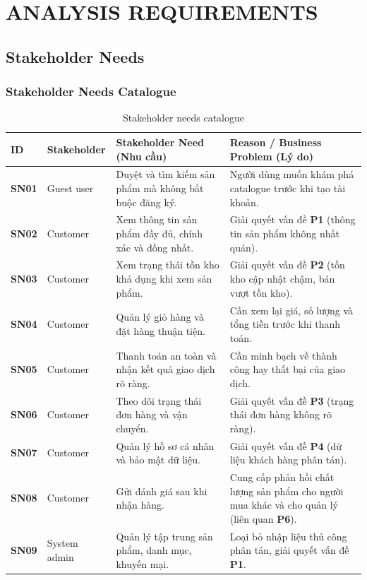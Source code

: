 \documentclass[12pt,a4paper,oneside]{report}
\begin{document}
\chapter{ANALYSIS REQUIREMENTS}

\section{Stakeholder Needs}

\subsection{Stakeholder Needs Catalogue}

\begin{longtable}{p{1.6cm}p{3cm}p{6cm}p{5.4cm}}
\caption{Stakeholder needs catalogue}\\
\toprule
\textbf{ID} & \textbf{Stakeholder} & \textbf{Stakeholder Need (Nhu cầu)} & \textbf{Reason / Business Problem (Lý do)} \\
\midrule
\endhead
\bottomrule
\endlastfoot
\textbf{SN01} & Guest user & Duyệt và tìm kiếm sản phẩm mà không bắt buộc đăng ký. & Người dùng muốn khám phá catalogue trước khi tạo tài khoản. \\
\textbf{SN02} & Customer & Xem thông tin sản phẩm đầy đủ, chính xác và đồng nhất. & Giải quyết vấn đề \textbf{P1} (thông tin sản phẩm không nhất quán). \\
\textbf{SN03} & Customer & Xem trạng thái tồn kho khả dụng khi xem sản phẩm. & Giải quyết vấn đề \textbf{P2} (tồn kho cập nhật chậm, bán vượt tồn kho). \\
\textbf{SN04} & Customer & Quản lý giỏ hàng và đặt hàng thuận tiện. & Cần xem lại giá, số lượng và tổng tiền trước khi thanh toán. \\
\textbf{SN05} & Customer & Thanh toán an toàn và nhận kết quả giao dịch rõ ràng. & Cần minh bạch về thành công hay thất bại của giao dịch. \\
\textbf{SN06} & Customer & Theo dõi trạng thái đơn hàng và vận chuyển. & Giải quyết vấn đề \textbf{P3} (trạng thái đơn hàng không rõ ràng). \\
\textbf{SN07} & Customer & Quản lý hồ sơ cá nhân và bảo mật dữ liệu. & Giải quyết vấn đề \textbf{P4} (dữ liệu khách hàng phân tán). \\
\textbf{SN08} & Customer & Gửi đánh giá sau khi nhận hàng. & Cung cấp phản hồi chất lượng sản phẩm cho người mua khác và cho quản lý (liên quan \textbf{P6}). \\
\textbf{SN09} & System admin & Quản lý tập trung sản phẩm, danh mục, khuyến mại. & Loại bỏ nhập liệu thủ công phân tán, giải quyết vấn đề \textbf{P1}. \\

\end{longtable}
\end{document}
